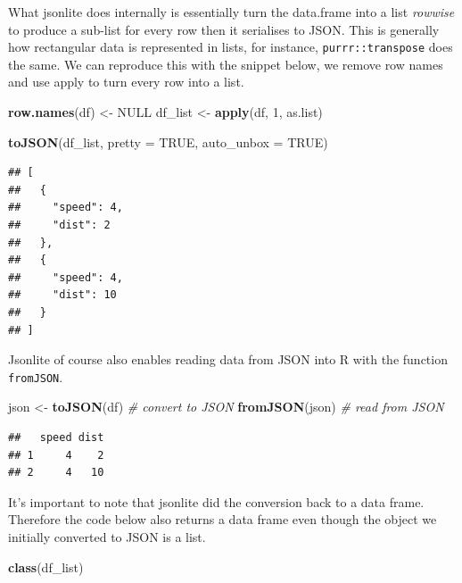 \documentclass[
]{krantz}
\makeatletter
\newenvironment{Shaded}{\begin{snugshade}}{\end{snugshade}}
\newcommand{\CommentTok}[1]{\textcolor[rgb]{0.37,0.37,0.37}{\textit{#1}}}
\newcommand{\DataTypeTok}[1]{\textcolor[rgb]{0.27,0.27,0.27}{#1}}
\newcommand{\DecValTok}[1]{\textcolor[rgb]{0.06,0.06,0.06}{#1}}
\newcommand{\KeywordTok}[1]{\textcolor[rgb]{0.27,0.27,0.27}{\textbf{#1}}}
\newcommand{\NormalTok}[1]{#1}
\newcommand{\OtherTok}[1]{\textcolor[rgb]{0.37,0.37,0.37}{#1}}
\newcommand{\StringTok}[1]{\textcolor[rgb]{0.5,0.5,0.5}{#1}}
\newenvironment{kframe}{%
\medskip{}
\setlength{\fboxsep}{.8em}
 \def\at@end@of@kframe{}%
 \ifinner\ifhmode%
  \def\at@end@of@kframe{\end{minipage}}%
  \begin{minipage}{\columnwidth}%
 \fi\fi%
 \def\FrameCommand##1{\hskip\@totalleftmargin \hskip-\fboxsep
 \colorbox{shadecolor}{##1}\hskip-\fboxsep
     \hskip-\linewidth \hskip-\@totalleftmargin \hskip\columnwidth}%
 \MakeFramed {\advance\hsize-\width
   \@totalleftmargin\z@ \linewidth\hsize
   \@setminipage}}%
 {\par\unskip\endMakeFramed%
 \at@end@of@kframe}
\renewenvironment{Shaded}{\begin{kframe}}{\end{kframe}}
\makeatother
\begin{document}
What jsonlite does internally is essentially turn the data.frame into a list \emph{rowwise} to produce a sub-list for every row then it serialises to JSON. This is generally how rectangular data is represented in lists, for instance, \texttt{purrr::transpose} does the same. We can reproduce this with the snippet below, we remove row names and use apply to turn every row into a list.

\begin{Shaded}
\begin{Highlighting}[]
\KeywordTok{row.names}\NormalTok{(df) <{-}}\StringTok{ }\OtherTok{NULL}
\NormalTok{df\_list <{-}}\StringTok{ }\KeywordTok{apply}\NormalTok{(df, }\DecValTok{1}\NormalTok{, as.list)}

\KeywordTok{toJSON}\NormalTok{(df\_list, }\DataTypeTok{pretty =} \OtherTok{TRUE}\NormalTok{, }\DataTypeTok{auto\_unbox =} \OtherTok{TRUE}\NormalTok{)}
\end{Highlighting}
\end{Shaded}

\begin{verbatim}
## [
##   {
##     "speed": 4,
##     "dist": 2
##   },
##   {
##     "speed": 4,
##     "dist": 10
##   }
## ]
\end{verbatim}

Jsonlite of course also enables reading data from JSON into R with the function \texttt{fromJSON}.

\begin{Shaded}
\begin{Highlighting}[]
\NormalTok{json <{-}}\StringTok{ }\KeywordTok{toJSON}\NormalTok{(df) }\CommentTok{\# convert to JSON}
\KeywordTok{fromJSON}\NormalTok{(json) }\CommentTok{\# read from JSON}
\end{Highlighting}
\end{Shaded}

\begin{verbatim}
##   speed dist
## 1     4    2
## 2     4   10
\end{verbatim}

It's important to note that jsonlite did the conversion back to a data frame. Therefore the code below also returns a data frame even though the object we initially converted to JSON is a list.

\begin{Shaded}
\begin{Highlighting}[]
\KeywordTok{class}\NormalTok{(df\_list)}
\end{Highlighting}
\end{Shaded}
\end{document}
